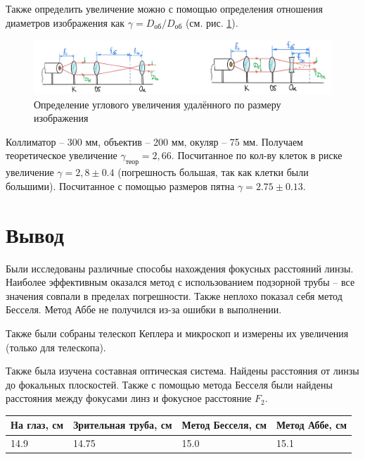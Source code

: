 \documentclass[a4paper,12pt]{article}
\theoremstyle{definition}
\begin{document}
Также определить увеличение можно с помощью определения отношения диаметров изображения как $\gamma = D_\text{об} / D_\text{об}$ (см. рис. \ref{pic:8}).

\begin{figure}[h!]
    \centering
    \includegraphics[width=18cm]{8.jpg}
    \caption{Определение углового увеличения удалённого по размеру изображения}\label{pic:8}
\end{figure}

Коллиматор -- 300 мм, объектив -- 200 мм, окуляр -- 75 мм.  Получаем теоретическое увеличение $\gamma_\text{теор} = 2,66$. Посчитанное по кол-ву клеток в риске увеличение $\gamma = 2,8 \pm 0.4$ (погрешность большая, так как клетки были большими). Посчитанное с помощью размеров пятна $\gamma = 2.75 \pm 0.13$.

\section{Вывод}

Были исследованы различные способы нахождения фокусных расстояний линзы. Наиболее эффективным оказался метод с использованием подзорной трубы -- все значения совпали в пределах погрешности. Также неплохо показал себя метод Бесселя. Метод Аббе не получился из-за ошибки в выполнении.

Также были собраны телескоп Кеплера и микроскоп и измерены их увеличения (только для телескопа).

Также была изучена составная оптическая система. Найдены расстояния от линзы до фокальных плоскостей. Также с помощью метода Бесселя были найдены расстояния между фокусами линз и фокусное расстояние $F_2$.

\begin{table}[h!]
\begin{tabular}{|l|l|l|l|}
\hline
На глаз, см & Зрительная труба, см & Метод Бесселя, см & Метод Аббе, см \\ \hline
14.9       & 14.75                & 15.0         & 15.1      \\ \hline
\end{tabular}
\end{table}
\end{document}
